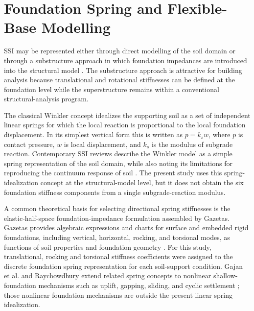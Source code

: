 \section{Foundation Spring and Flexible-Base Modelling}
SSI may be represented either through direct modelling of the soil domain or through a substructure approach in which foundation impedances are introduced into the structural model \cite{wolf1985,gajan2008}. The substructure approach is attractive for building analysis because translational and rotational stiffnesses can be defined at the foundation level while the superstructure remains within a conventional structural-analysis program.

The classical Winkler concept idealizes the supporting soil as a set of independent linear springs for which the local reaction is proportional to the local foundation displacement. In its simplest vertical form this is written as $p=k_s w$, where $p$ is contact pressure, $w$ is local displacement, and $k_s$ is the modulus of subgrade reaction. Contemporary SSI reviews describe the Winkler model as a simple spring representation of the soil domain, while also noting its limitations for reproducing the continuum response of soil \cite{krishnan2024}. The present study uses this spring-idealization concept at the structural-model level, but it does not obtain the six foundation stiffness components from a single subgrade-reaction modulus.

A common theoretical basis for selecting directional spring stiffnesses is the elastic-half-space foundation-impedance formulation assembled by Gazetas. Gazetas provides algebraic expressions and charts for surface and embedded rigid foundations, including vertical, horizontal, rocking, and torsional modes, as functions of soil properties and foundation geometry \cite{gazetas1991}. For this study, translational, rocking and torsional stiffness coefficients were assigned to the discrete foundation spring representation for each soil-support condition. Gajan et al. and Raychowdhury extend related spring concepts to nonlinear shallow-foundation mechanisms such as uplift, gapping, sliding, and cyclic settlement \cite{gajan2008,raychowdhury2008}; those nonlinear foundation mechanisms are outside the present linear spring idealization.


